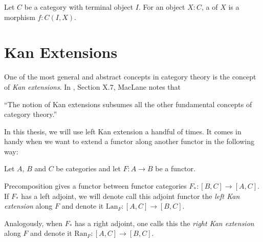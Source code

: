 \begin{definition}
  Let $ C $ be a category with terminal object $ I $. For an object $ X: C $, a  of $ X $ is a morphism $ f: C(I, X) $.
\end{definition}


\section{Kan Extensions}
One of the most general and abstract concepts in category theory is the concept of \textit{Kan extensions}. In \autocite{MacLane}, Section X.7, MacLane notes that

\enquote{The notion of Kan extensions subsumes all the other fundamental concepts of category theory.}

In this thesis, we will use left Kan extension a handful of times. It comes in handy when we want to extend a functor along another functor in the following way:

Let $ A $, $ B $ and $ C $ be categories and let $ F : A \to B $ be a functor.
\begin{definition}
  Precomposition gives a functor between functor categories $ F_* : [B, C] \to [A, C] $. If $ F_* $ has a left adjoint, we will denote call this adjoint functor the \textit{left Kan extension} along $ F $ and denote it $ \mathrm{Lan}_F : [A, C] \to [B, C] $.

  \begin{center}
    \qquad
  \end{center}

  Analogously, when $ F_* $ has a right adjoint, one calls this the \textit{right Kan extension} along $ F $ and denote it $ \mathrm{Ran}_F: [A, C] \to [B, C] $.
\end{definition}

